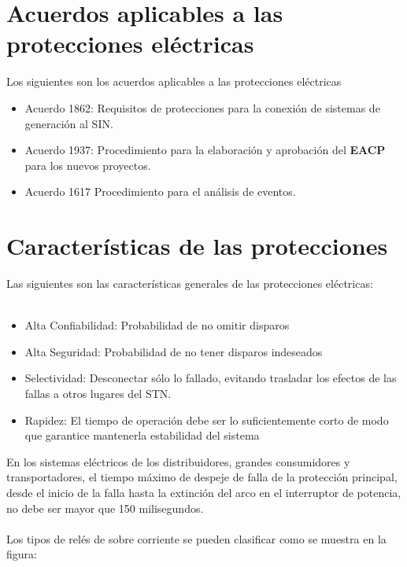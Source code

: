 \documentclass[a5paper]{book}%
\begin{document}
    \section{Acuerdos aplicables a las protecciones eléctricas}
    
    Los siguientes son los acuerdos aplicables a las protecciones eléctricas 
    
    \begin{itemize}
    	\item Acuerdo 1862: Requisitos de protecciones para la conexión de sistemas de generación al SIN.
    	\item Acuerdo 1937: Procedimiento para la elaboración  y aprobación  del \textbf{EACP} para los nuevos proyectos.
    	\item  Acuerdo 1617 Procedimiento para el análisis de eventos.
    \end{itemize}
    
\section{Características de las protecciones}
Las siguientes son las características generales de las protecciones eléctricas:\\\\
\begin{itemize}
	\item Alta Confiabilidad: Probabilidad de no omitir disparos
	\item Alta Seguridad: Probabilidad de no tener disparos indeseados
	\item Selectividad: Desconectar sólo lo fallado, evitando trasladar los efectos de las fallas a otros lugares del STN. 
	\item Rapidez: El tiempo de operación debe ser lo suficientemente corto de modo que garantice mantenerla estabilidad del sistema
\end{itemize}

En los sistemas eléctricos de los distribuidores, grandes consumidores y transportadores, el tiempo máximo de despeje de falla de la protección principal, desde el inicio de la falla hasta la extinción del arco en el interruptor de potencia, no debe
ser mayor que 150 milisegundos.\\\\

Los tipos de relés de sobre corriente se pueden clasificar como se muestra en la figura:
\end{document}
